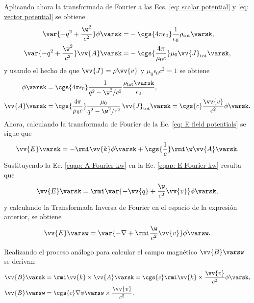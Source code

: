 Aplicando ahora la transformada de Fourier a las Ecs. \eqref{eq: scalar potential} y \eqref{eq: vector potential} se obtiene 
\begin{align}
\var{-q^2+\frac{\w^2}{c^2}}\phi\varsk =& -\cgs{4\pi\epsilon_0}\frac{1}{\epsilon_0}\rho_{\text{tot}}\varsk, \\
\var{-q^2+\frac{\w^2}{c^2}}\vv{A}\varsk =& - \cgs{\frac{4\pi}{\mu_0 c}}\mu_0\vv{J}_{\text{tot}}\varsk, 
\end{align}
y usando el hecho de que $\vv{J} = \rho \vv{v}$ y $\mu_0 \epsilon_0 c^2 = 1$ se obtiene
\begin{align}
\phi\varsk &= \cgs{4\pi\epsilon_0}\frac{1}{q^2-\w^2/c^2} \frac{\rho_{\rm tot}\varsk}{\epsilon_0}, \label{eqap: phi Fourier kw} \\
\vv{A}\varsk &= \cgs{\frac{4\pi}{\mu_0 c}}\frac{\mu_0}{q^2-\w^2/c^2}\,\vv{J}_{\text{tot}}\varsk = \cgs{c}\frac{\vv{v}}{c^2}\phi\varsk. \label{eqap: A Fourier kw}
\end{align}
Ahora, calculando la transformada de Fourier de la Ec. \eqref{eq: E field potentials} se sigue que
\begin{equation}
\vv{E}\varsk = - \rmi \vv{k} \phi\varsk + \cgs{\frac{1}{c}}\rmi \w \vv{A}\varsk \label{eqap: E Fourier kw}.
\end{equation}
Sustituyendo la Ec. \eqref{eqap: A Fourier kw} en la Ec. \eqref{eqap: E Fourier kw} resulta que
\begin{equation}
\vv{E}\varsk = \rmi \var{-\vv{q}+\frac{\w}{c^2}\vv{v}}\phi\varsk, 
\end{equation}
y calculando la Transformada Inversa de Fourier en el espacio de la expresión anterior, se obtiene
\begin{equation}
\vv{E}\varsw = \var{-\nabla+\rmi \frac{\w}{c^2}\vv{v}}\phi\varsw.
\end{equation}

Realizando el proceso análogo para calcular el campo magnético $\vv{B}\varsw$ se derivan:
\begin{align}
\vv{B}\varsk &= \rmi \vv{k}\times\vv{A}\varsk = \cgs{c}\rmi \vv{k}\times\frac{\vv{v}}{c^2}\phi\varsk,\\
\vv{B}\varsw &= \cgs{c}\nabla \phi\varsw\times\frac{\vv{v}}{c^2}.
\end{align}


